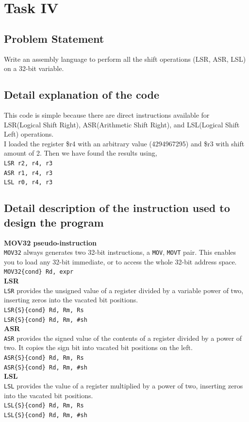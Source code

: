 \documentclass[footheight=20pt, footsepline, headheight=20pt, headsepline]{scrartcl}
\begin{document}
\FloatBarrier
\section*{Task IV}
\subsection*{Problem Statement}
Write an assembly language to perform all the shift operations (LSR, ASR, LSL) on a 32-bit variable.
\subsection*{Detail explanation of the code}
This code is simple because there are direct instructions available for LSR(Logical Shift Right), ASR(Arithmetic Shift Right), and LSL(Logical Shift Left) operations. \\I loaded the register \$r4 with an arbitrary value (4294967295) and \$r3 with shift amount of 2. Then we have found the results using, \\
\verb|LSR r2, r4, r3|\\
\verb|ASR r1, r4, r3|\\
\verb|LSL r0, r4, r3|
\subsection*{Detail description of the instruction used to design the program}
\textbf{MOV32 pseudo-instruction}\\
\verb|MOV32| always generates two 32-bit instructions, a \verb|MOV|, \verb|MOVT| pair. This enables you to load any 32-bit immediate, or to access the whole 32-bit address space.\\
\verb|MOV32{cond} Rd, expr|\\
\textbf{LSR}\\
\verb|LSR| provides the unsigned value of a register divided by a variable power of two, inserting zeros into the vacated bit positions.\\
\verb|LSR{S}{cond} Rd, Rm, Rs|\\
\verb|LSR{S}{cond} Rd, Rm, #sh|\\
\textbf{ASR}\\
\verb|ASR| provides the signed value of the contents of a register divided by a power of two. It copies the sign bit into vacated bit positions on the left.\\
\verb|ASR{S}{cond} Rd, Rm, Rs|\\
\verb|ASR{S}{cond} Rd, Rm, #sh|\\
\textbf{LSL}\\
\verb|LSL| provides the value of a register multiplied by a power of two, inserting zeros into the vacated bit positions.\\
\verb|LSL{S}{cond} Rd, Rm, Rs|\\
\verb|LSL{S}{cond} Rd, Rm, #sh|
\end{document}

